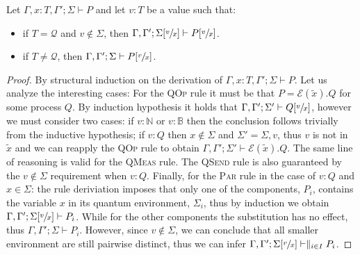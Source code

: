 \begin{theorem}
  Let $\Gamma, x : T, \Gamma'; \Sigma \vdash P$ and let $v : T$ be a value such that:
  \begin{itemize}
    \item if $T = \mathcal{Q}$ and $v \not\in \Sigma$, then $\Gamma, \Gamma'; \Sigma[\sfrac{v}{x}] \vdash P[\sfrac{v}{x}]$.
    \item if $T \neq \mathcal{Q}$, then $\Gamma, \Gamma'; \Sigma \vdash P[\sfrac{v}{x}]$.
  \end{itemize}
\end{theorem}
\begin{proof}
  By structural induction on the derivation of $\Gamma, x : T, \Gamma'; \Sigma \vdash P$.
  Let us analyze the interesting cases: For the \textsc{QOp} rule it must be that $P = \mathcal{E}(\widetilde{x}).Q$ for some process $Q$.
  By induction hypothesis it holds that $\Gamma, \Gamma'; \Sigma' \vdash Q[\sfrac{v}{x}]$, however we must consider two cases:
  if $v : \mathbb{N}$ or $v : \mathbb{B}$ then the conclusion follows trivially from the inductive hypothesis;
  if $v : Q$ then $x \not\in \Sigma$ and $\Sigma' = \Sigma, v$, thus $v$ is not in $\widetilde{x}$ and we can reapply the \textsc{QOp} rule to obtain
  $\Gamma, \Gamma'; \Sigma' \vdash \mathcal{E}(\widetilde{x}).Q$. The same line of reasoning is valid for the \textsc{QMeas} rule.
  The \textsc{QSend} rule is also guaranteed by the $v \not\in \Sigma$ requirement when $v : Q$.
  Finally, for the \textsc{Par} rule in the case of $v : Q$ and $x \in \Sigma$: the rule deriviation imposes that only one of the components, $P_i$,
  contains the variable $x$ in its quantum environment, $\Sigma_i$, thus by induction we obtain $\Gamma, \Gamma'; \Sigma[\sfrac{v}{x}] \vdash P_i$.
  While for the other components the substitution has no effect, thus $\Gamma, \Gamma'; \Sigma \vdash P_i$. However, since $v \not\in \Sigma$, we can
  conclude that all smaller environment are still pairwise distinct, thus we can infer $\Gamma, \Gamma'; \Sigma[\sfrac{v}{x}] \vdash \parallel_{i \in I} P_i$.
\end{proof}

